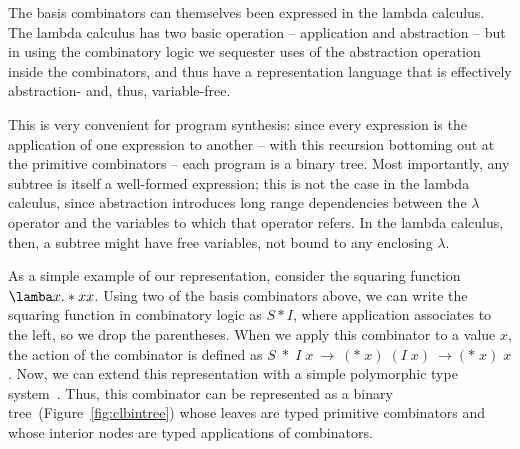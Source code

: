 \documentclass{article}
\begin{document}
The basis combinators can
themselves been expressed in the lambda calculus. The lambda calculus
has two basic operation -- application and abstraction -- but in using
the combinatory logic we sequester uses of the abstraction operation
inside the combinators, and thus have a representation language that
is effectively abstraction- and, thus, variable-free. 

This is very convenient for program synthesis: since every expression
is the application of one expression to another -- with this recursion
bottoming out at the primitive combinators -- each program is a binary
tree. Most importantly, any subtree is itself a well-formed
expression; this is not the case in the lambda calculus, since
abstraction introduces long range dependencies between the $\lambda$
operator and the variables to which that operator refers. In the
lambda calculus, then, a subtree might have free variables, not bound
to any enclosing $\lambda$. 

As a simple example of our representation, consider the squaring
function $\lamba x. * x x $. Using two of the basis combinators above,
we can write the squaring function in combinatory logic as $S * I$,
where application associates to the left, so we drop the
parentheses. When we apply this combinator to a value $x$, the action
of the combinator is defined as $S \;*\; I\; x~\rightarrow~(*\; x)\;
(I\; x)~\rightarrow(*\; x)\; x$. Now, we can extend this
representation with a simple polymorphic type
system~\cite{Pierce_2002}. Thus, this combinator can be represented as
a binary tree~(Figure~\ref{fig:clbintree}) whose leaves are typed
primitive combinators and whose interior nodes are typed applications of combinators.
\end{document}
